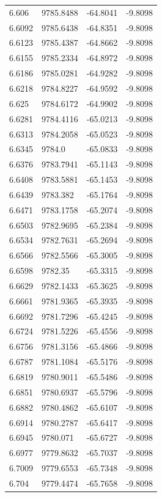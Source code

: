 \begin{table}[H]
\begin{tabular}{llll}
6.606 & 9785.8488 & -64.8041 & -9.8098 \\
6.6092 & 9785.6438 & -64.8351 & -9.8098 \\
6.6123 & 9785.4387 & -64.8662 & -9.8098 \\
6.6155 & 9785.2334 & -64.8972 & -9.8098 \\
6.6186 & 9785.0281 & -64.9282 & -9.8098 \\
6.6218 & 9784.8227 & -64.9592 & -9.8098 \\
6.625 & 9784.6172 & -64.9902 & -9.8098 \\
6.6281 & 9784.4116 & -65.0213 & -9.8098 \\
6.6313 & 9784.2058 & -65.0523 & -9.8098 \\
6.6345 & 9784.0 & -65.0833 & -9.8098 \\
6.6376 & 9783.7941 & -65.1143 & -9.8098 \\
6.6408 & 9783.5881 & -65.1453 & -9.8098 \\
6.6439 & 9783.382 & -65.1764 & -9.8098 \\
6.6471 & 9783.1758 & -65.2074 & -9.8098 \\
6.6503 & 9782.9695 & -65.2384 & -9.8098 \\
6.6534 & 9782.7631 & -65.2694 & -9.8098 \\
6.6566 & 9782.5566 & -65.3005 & -9.8098 \\
6.6598 & 9782.35 & -65.3315 & -9.8098 \\
6.6629 & 9782.1433 & -65.3625 & -9.8098 \\
6.6661 & 9781.9365 & -65.3935 & -9.8098 \\
6.6692 & 9781.7296 & -65.4245 & -9.8098 \\
6.6724 & 9781.5226 & -65.4556 & -9.8098 \\
6.6756 & 9781.3156 & -65.4866 & -9.8098 \\
6.6787 & 9781.1084 & -65.5176 & -9.8098 \\
6.6819 & 9780.9011 & -65.5486 & -9.8098 \\
6.6851 & 9780.6937 & -65.5796 & -9.8098 \\
6.6882 & 9780.4862 & -65.6107 & -9.8098 \\
6.6914 & 9780.2787 & -65.6417 & -9.8098 \\
6.6945 & 9780.071 & -65.6727 & -9.8098 \\
6.6977 & 9779.8632 & -65.7037 & -9.8098 \\
6.7009 & 9779.6553 & -65.7348 & -9.8098 \\
6.704 & 9779.4474 & -65.7658 & -9.8098 \\

\end{tabular}
\end{table}
